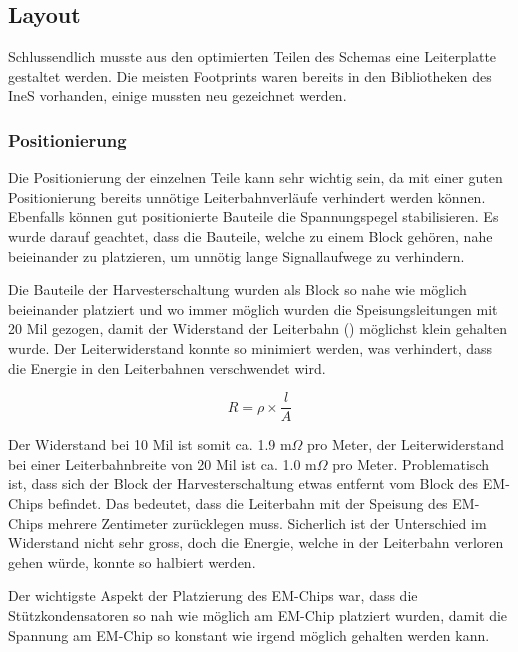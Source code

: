 \subsection{Layout}

Schlussendlich musste aus den optimierten Teilen des Schemas eine Leiterplatte gestaltet werden. Die meisten Footprints waren bereits in den Bibliotheken des IneS vorhanden, einige mussten neu gezeichnet werden.

\subsubsection{Positionierung}

Die Positionierung der einzelnen Teile kann sehr wichtig sein, da mit einer guten Positionierung bereits unnötige Leiterbahnverläufe verhindert werden können. Ebenfalls können gut positionierte Bauteile die Spannungspegel stabilisieren. Es wurde darauf geachtet, dass die Bauteile, welche zu einem Block gehören, nahe beieinander zu platzieren, um unnötig lange Signallaufwege zu verhindern.

Die Bauteile der Harvesterschaltung wurden als Block so nahe wie möglich beieinander platziert und wo immer möglich wurden die Speisungsleitungen mit 20 Mil gezogen, damit der Widerstand der Leiterbahn (\cite{eqn_res_leiter}) möglichst klein gehalten wurde. Der Leiterwiderstand konnte so minimiert werden, was verhindert, dass die Energie in den Leiterbahnen verschwendet wird.

\begin{equation}
	R = \rho \times \frac{l}{A}
\end{equation}

Der Widerstand bei 10 Mil ist somit ca. 1.9 m$\Omega$ pro Meter, 
der Leiterwiderstand bei einer Leiterbahnbreite von 20 Mil ist ca. 1.0 m$\Omega$ pro Meter. Problematisch ist, dass sich der Block der Harvesterschaltung etwas entfernt vom Block des EM-Chips befindet. Das bedeutet, dass die Leiterbahn mit der Speisung des EM-Chips mehrere Zentimeter zurücklegen muss. Sicherlich ist der Unterschied im Widerstand nicht sehr gross, doch die Energie, welche in der Leiterbahn verloren gehen würde, konnte so halbiert werden.

Der wichtigste Aspekt der Platzierung des EM-Chips war, dass die Stützkondensatoren so nah wie möglich am EM-Chip platziert wurden, damit die Spannung am EM-Chip so konstant wie irgend möglich gehalten werden kann.

